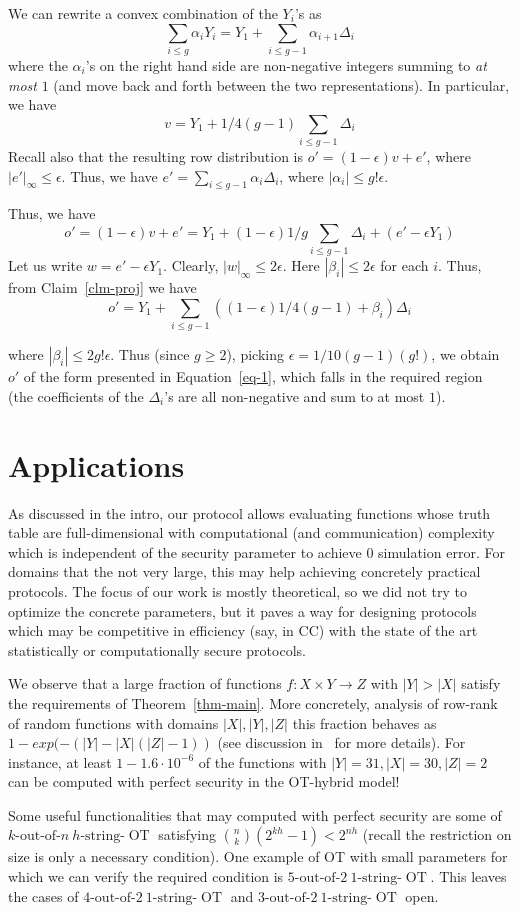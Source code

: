 \documentclass{llncs}
\newcommand{\OT}{\operatorname{OT}}
\newcommand{\sOT}[3]{#1\text{-out-of-}#2~#3\text{-string-}\OT}
\begin{document}
We can rewrite a convex combination of the $Y_i$'s as
\begin{equation}\label{eq-1}
\sum_{i\leq g}\alpha_iY_i=Y_1+\sum_{i\leq g-1}\alpha_{i+1} \Delta_i
\end{equation}
where the $\alpha_i$'s on the right hand side are non-negative integers summing to \emph{at most} $1$ (and move back and forth between the two representations). In particular, we have
\[v = Y_1+1/4(g-1)\sum_{i\leq g-1}\Delta_i\]
Recall also that the resulting row distribution is
$o'=(1-\epsilon)v + e'$, where $|e'|_\infty\leq \epsilon$.
Thus, we have $e'=\sum_{i\leq g-1}\alpha_i\Delta_i$, where $|\alpha_i|\leq g!\epsilon$. 

Thus, we have
\[o'=(1-\epsilon)v+e'=Y_1+(1-\epsilon)1/g\sum_{i\leq g-1}\Delta_i+(e'-\epsilon Y_1)\]
Let us write $w=e'-\epsilon Y_1$. Clearly, $|w|_\infty\leq 2\epsilon$.
Here $|\beta_i|\leq 2\epsilon$ for each $i$.
Thus, from Claim~\ref{clm-proj} we have
\[o'= Y_1+\sum_{i\leq g-1}((1-\epsilon)1/4(g-1)+\beta_i)\Delta_i\]

where $|\beta_i|\leq 2g!\epsilon$. Thus (since $g\geq 2$), picking $\epsilon=1/10(g-1)(g!)$, we obtain $o'$ of the form presented in Equation~\ref{eq-1}, which falls in the required region (the coefficients of the $\Delta_i$'s are all non-negative and sum to at most $1$). 


\section{Applications}

As discussed in the intro, our protocol allows evaluating functions whose truth table are full-dimensional with computational (and communication) complexity which is independent of the security parameter to achieve 0 simulation error.
For domains that the not very large, this may help achieving concretely practical protocols. The focus of our work is mostly theoretical, so we did not try to optimize the concrete parameters, but it paves a way for designing protocols which may be competitive in efficiency (say, in CC) with the state of the art statistically or computationally secure protocols.

We observe that a large fraction of functions $f:X\times Y\rightarrow Z$ with $|Y|>|X|$ satisfy the requirements of Theorem~\ref{thm-main}. More concretely, analysis of row-rank of random functions with domains $|X|,|Y|,|Z|$ this fraction behaves
as $1-exp(-(|Y|-|X|(|Z|-1))$ (see discussion in~\cite{Ah14} for more details). For instance, at least $1-1.6\cdot 10^{-6}$ of the functions with $|Y|=31,|X|=30,|Z|=2$ can be computed with perfect security in the OT-hybrid model!

Some useful functionalities that may computed with perfect security are some of $\sOT{k}{n}{h}$ satisfying ${n \choose k} (2^{kh}-1) < 2^{nh}$ (recall the restriction on size is only a necessary condition).
One example of OT with small parameters for which we can verify the required condition is $\sOT{5}{2}{1}$. This leaves the cases of $\sOT{4}{2}{1}$ and $\sOT{3}{2}{1}$ open.




\end{document}
